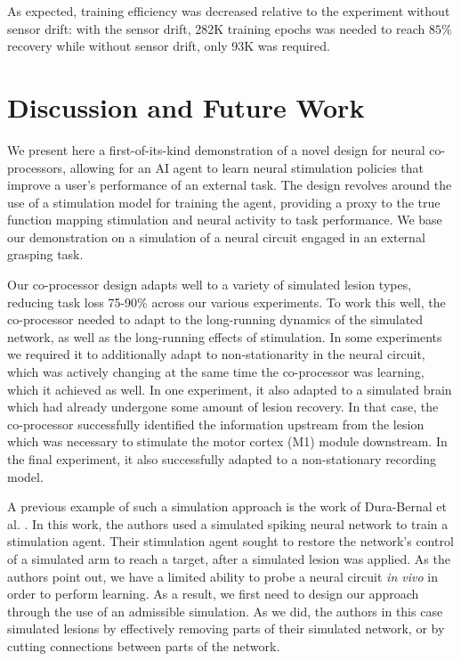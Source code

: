\documentclass[12pt]{iopart}
\begin{document}
As expected, training efficiency was decreased relative to
the experiment without sensor drift: with the sensor drift,
282K training epochs was needed to reach $85\%$ recovery while
without sensor drift,  only 93K was required.

\section{Discussion and Future Work}
\label{sec:discussion}

We present here a first-of-its-kind demonstration of a novel design for neural co-processors,
allowing for an AI agent to learn neural stimulation policies that improve a user's performance
of an external task. The design revolves around the use of a stimulation model for training the
agent, providing a proxy to the true function mapping stimulation and neural activity
to task performance. We base our demonstration on a simulation of a neural circuit engaged in
an external grasping task.

Our co-processor design adapts well to a variety of simulated lesion types, reducing task loss
75-90\% across our various experiments. To work this well, the co-processor needed to adapt to
the long-running dynamics of the simulated network, as well as the long-running effects of
stimulation. In some experiments we required it to additionally adapt to non-stationarity in
the neural circuit, which was actively changing at the same time the co-processor was learning, which it achieved as well. In one experiment, it also adapted to a simulated brain which had already undergone some amount of
lesion recovery. In that case, the co-processor successfully identified the information upstream
from the lesion which was necessary to stimulate the motor cortex (M1) module
downstream. In the final experiment, it also successfully adapted to a non-stationary recording model.

A previous example of such a simulation approach is the work of Dura-Bernal et al. \cite{bernal.sim}. In this work, the
authors used a simulated spiking neural network to train a stimulation agent.
Their stimulation agent sought to restore the network's
control of a simulated arm to reach a target, after a simulated lesion was
applied. As the authors point out, we have a limited ability to
probe a neural circuit \textit{in vivo} in order to perform learning. As a result,
we first need to design our approach through the use of an admissible simulation.
As we did, the authors in this case simulated lesions by effectively removing parts
of their simulated network, or by cutting connections between parts of the network.
\end{document}
